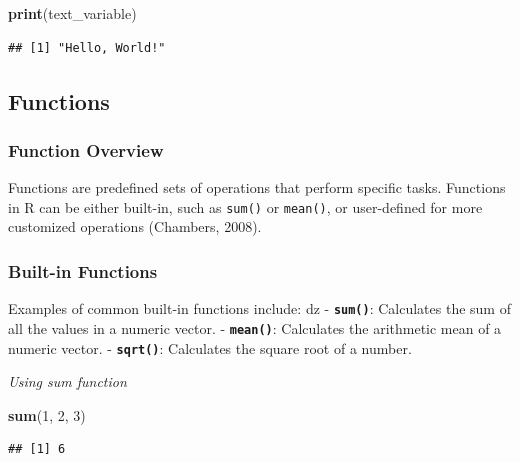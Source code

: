 \documentclass[
  b5paper]{book}
\newenvironment{Shaded}{\begin{snugshade}}{\end{snugshade}}
\newcommand{\DecValTok}[1]{\textcolor[rgb]{0.00,0.00,0.81}{#1}}
\newcommand{\FunctionTok}[1]{\textcolor[rgb]{0.13,0.29,0.53}{\textbf{#1}}}
\newcommand{\NormalTok}[1]{#1}
\begin{document}
\begin{Shaded}
\begin{Highlighting}[]
\FunctionTok{print}\NormalTok{(text\_variable)}
\end{Highlighting}
\end{Shaded}

\begin{verbatim}
## [1] "Hello, World!"
\end{verbatim}

\hypertarget{functions}{%
\subsection*{Functions}\label{functions}}

\hypertarget{function-overview}{%
\subsubsection*{Function Overview}\label{function-overview}}

Functions are predefined sets of operations that perform specific tasks. Functions in R can be either built-in, such as \texttt{sum()} or \texttt{mean()}, or user-defined for more customized operations (Chambers, 2008).

\hypertarget{built-in-functions}{%
\subsubsection*{Built-in Functions}\label{built-in-functions}}

Examples of common built-in functions include:
dz
- \textbf{\texttt{sum()}}: Calculates the sum of all the values in a numeric vector.
- \textbf{\texttt{mean()}}: Calculates the arithmetic mean of a numeric vector.
- \textbf{\texttt{sqrt()}}: Calculates the square root of a number.

\emph{Using sum function}

\begin{Shaded}
\begin{Highlighting}[]
\FunctionTok{sum}\NormalTok{(}\DecValTok{1}\NormalTok{, }\DecValTok{2}\NormalTok{, }\DecValTok{3}\NormalTok{)}
\end{Highlighting}
\end{Shaded}

\begin{verbatim}
## [1] 6
\end{verbatim}
\end{document}
